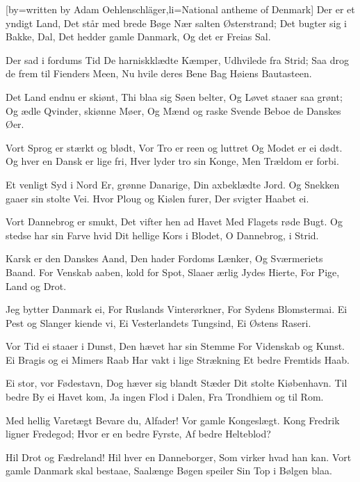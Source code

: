 [by={written by Adam Oehlenschläger},li={National antheme of Denmark}]
\beginverse
Der er et yndigt Land, 
Det står med brede Bøge 
Nær salten Østerstrand; 
Det bugter sig i Bakke, Dal, 
Det hedder gamle Danmark, 
Og det er Freias Sal.
\endverse

\beginverse
Der sad i fordums Tid 
De harniskklædte Kæmper, 
Udhvilede fra Strid; 
Saa drog de frem til Fienders Meen, 
Nu hvile deres Bene 
Bag Høiens Bautasteen.
\endverse 

\beginverse 
Det Land endnu er skiønt, 
Thi blaa sig Søen belter, 
Og Løvet staaer saa grønt; 
Og ædle Qvinder, skiønne Møer, 
Og Mænd og raske Svende 
Beboe de Danskes Øer.
\endverse

\beginverse
Vort Sprog er stærkt og blødt, 
Vor Tro er reen og luttret 
Og Modet er ei dødt. 
Og hver en Dansk er lige fri, 
Hver lyder tro sin Konge, 
Men Trældom er forbi.
\endverse
 
\beginverse
Et venligt Syd i Nord 
Er, grønne Danarige, 
Din axbeklædte Jord. 
Og Snekken gaaer sin stolte Vei. 
Hvor Ploug og Kiølen furer, 
Der svigter Haabet ei.
\endverse

\beginverse 
Vort Dannebrog er smukt, 
Det vifter hen ad Havet 
Med Flagets røde Bugt. 
Og stedse har sin Farve hvid 
Dit hellige Kors i Blodet, 
O Dannebrog, i Strid.
\endverse

\beginverse 
Karsk er den Danskes Aand, 
Den hader Fordoms Lænker, 
Og Sværmeriets Baand. 
For Venskab aaben, kold for Spot, 
Slaaer ærlig Jydes Hierte, 
For Pige, Land og Drot.
\endverse

\beginverse
Jeg bytter Danmark ei, 
For Ruslands Vinterørkner, 
For Sydens Blomstermai. 
Ei Pest og Slanger kiende vi, 
Ei Vesterlandets Tungsind, 
Ei Østens Raseri.
\endverse
 
\beginverse
Vor Tid ei staaer i Dunst, 
Den hævet har sin Stemme 
For Videnskab og Kunst. 
Ei Bragis og ei Mimers Raab 
Har vakt i lige Strækning 
Et bedre Fremtids Haab.
\endverse

\beginverse 
Ei stor, vor Fødestavn, 
Dog hæver sig blandt Stæder 
Dit stolte Kiøbenhavn. 
Til bedre By ei Havet kom, 
Ja ingen Flod i Dalen, 
Fra Trondhiem og til Rom.
\endverse

\beginverse 
Med hellig Varetægt 
Bevare du, Alfader! 
Vor gamle Kongeslægt. 
Kong Fredrik ligner Fredegod;
Hvor er en bedre Fyrste, 
Af bedre Helteblod?
\endverse

\beginverse 
Hil Drot og Fædreland! 
Hil hver en Danneborger, 
Som virker hvad han kan. 
Vort gamle Danmark skal bestaae, 
Saalænge Bøgen speiler 
Sin Top i Bølgen blaa.
\endverse
\endsong